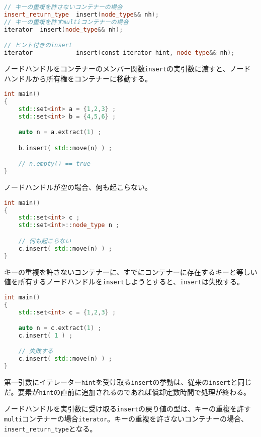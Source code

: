 \bgroup
\begin{lstlisting}[language=C++]
// キーの重複を許さないコンテナーの場合
insert_return_type  insert(node_type&& nh);
// キーの重複を許すmultiコンテナーの場合
iterator  insert(node_type&& nh);

// ヒント付きのinsert
iterator            insert(const_iterator hint, node_type&& nh);
\end{lstlisting}
\egroup

ノードハンドルをコンテナーのメンバー関数\lstinline!insert!の実引数に渡すと、ノードハンドルから所有権をコンテナーに移動する。

\begin{lstlisting}[language=C++]
int main()
{
    std::set<int> a = {1,2,3} ;
    std::set<int> b = {4,5,6} ;

    auto n = a.extract(1) ;

    b.insert( std::move(n) ) ;

    // n.empty() == true
}
\end{lstlisting}

ノードハンドルが空の場合、何も起こらない。

\begin{lstlisting}[language=C++]
int main()
{
    std::set<int> c ;
    std::set<int>::node_type n ;

    // 何も起こらない
    c.insert( std::move(n) ) ;
}
\end{lstlisting}

キーの重複を許さないコンテナーに、すでにコンテナーに存在するキーと等しい値を所有するノードハンドルを\lstinline!insert!しようとすると、\lstinline!insert!は失敗する。

\begin{lstlisting}[language=C++]
int main()
{
    std::set<int> c = {1,2,3} ;

    auto n = c.extract(1) ;
    c.insert( 1 ) ;

    // 失敗する
    c.insert( std::move(n) ) ; 
}
\end{lstlisting}

第一引数にイテレーター\lstinline!hint!を受け取る\lstinline!insert!の挙動は、従来の\lstinline!insert!と同じだ。要素が\lstinline!hint!の直前に追加されるのであれば償却定数時間で処理が終わる。

ノードハンドルを実引数に受け取る\lstinline!insert!の戻り値の型は、キーの重複を許す\lstinline!multi!コンテナーの場合\lstinline!iterator!。キーの重複を許さないコンテナーの場合、\lstinline!insert_return_type!となる。

